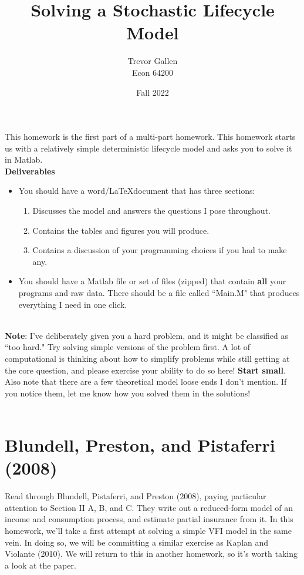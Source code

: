 \documentclass[11pt]{article}
\title{Solving a Stochastic Lifecycle Model}
\author{ Trevor Gallen \\ Econ 64200 }
\date{Fall 2022}
\begin{document}


\maketitle

This homework is the first part of a multi-part homework.  This homework starts us with a relatively simple deterministic lifecycle model and asks you to solve it in Matlab.\\

\textbf{Deliverables}
\begin{itemize}
\item You should have a word/\LaTeX document that has three sections: 
\begin{enumerate}
\item Discusses the model and answers the questions I pose throughout.
\item Contains the tables and figures you will produce.
\item Contains a discussion of your programming choices if you had to make any.
\end{enumerate}
\item You should have a Matlab file or set of files (zipped) that contain \textbf{all} your programs and raw data.  There should be a file called ``Main.M" that produces everything I need in one click.
\end{itemize}
\ \\
\textbf{Note}: I've deliberately given you a  hard problem, and it might be classified as ``too hard."   Try solving simple versions of the problem first.  A lot of computational is thinking about how to simplify problems while still getting at the core question, and please exercise your ability to do so here!  \textbf{Start small}.  Also note that there are a few theoretical model loose ends I don't mention.  If you notice them, let me know how you solved them in the solutions!\\
\ \\


\section{Blundell, Preston, and Pistaferri (2008)}
Read through Blundell, Pistaferri, and Preston (2008), paying particular attention to Section II A, B, and C.  They write out a reduced-form model of an income and consumption process, and estimate partial insurance from it.  In this homework, we'll take a first attempt at solving a simple VFI model in the same vein.  In doing so, we will be committing a similar exercise as Kaplan and Violante (2010).  We will return to this in another homework, so it's worth taking a look at the paper.
\end{document}

